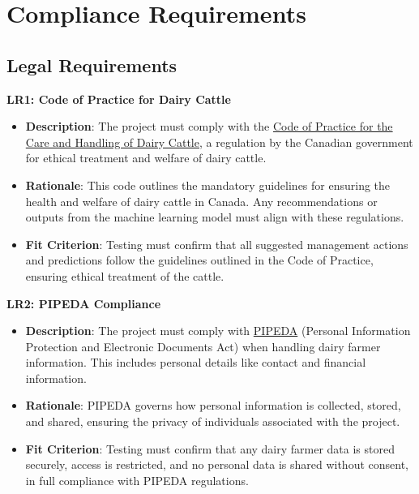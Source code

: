 \documentclass[12pt]{article}
\begin{document}
\section{Compliance Requirements}
\subsection{Legal Requirements}
\textbf{LR1: Code of Practice for Dairy Cattle}
\begin{itemize}
    \item \textbf{Description}: The project must comply with the
    \href{https://www.nfacc.ca/codes-of-practice/dairy-cattle}{Code of Practice
    for the Care and Handling of Dairy Cattle}, a regulation by the Canadian
    government for ethical treatment and welfare of dairy cattle.
    \item \textbf{Rationale}: This code outlines the mandatory guidelines for
    ensuring the health and welfare of dairy cattle in Canada. Any
    recommendations or outputs from the machine learning model must align with
    these regulations.
    \item \textbf{Fit Criterion}: Testing must confirm that all suggested
    management actions and predictions follow the guidelines outlined in the
    Code of Practice, ensuring ethical treatment of the cattle.
\end{itemize}

\textbf{LR2: PIPEDA Compliance}
\begin{itemize}
    \item \textbf{Description}: The project must comply with
    \href{https://laws-lois.justice.gc.ca/pdf/p-8.6.pdf}{PIPEDA} (Personal
    Information Protection and Electronic Documents Act) when handling dairy
    farmer information. This includes personal details like contact and
    financial information.
    \item \textbf{Rationale}: PIPEDA governs how personal information is
    collected, stored, and shared, ensuring the privacy of individuals
    associated with the project.
    \item \textbf{Fit Criterion}: Testing must confirm that any dairy farmer
    data is stored securely, access is restricted, and no personal data is
    shared without consent, in full compliance with PIPEDA regulations.
\end{itemize}
\end{document}
